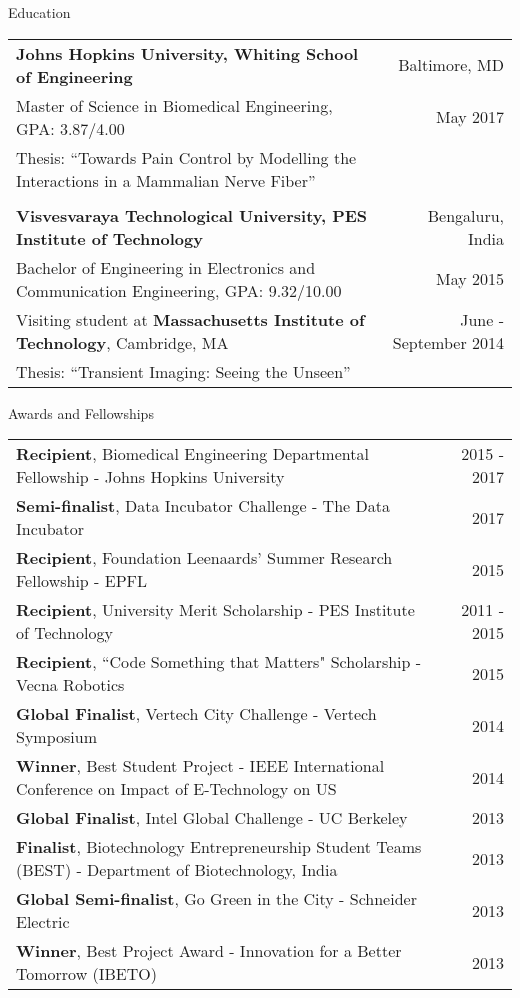 \documentclass{resume}
\begin{document}
\thispagestyle{empty}
  \begin{rSection}{Education}
\begin{tabular*}{\textwidth}{@{\extracolsep{\fill}}lr@{}}
\textbf{Johns Hopkins University, Whiting School of Engineering} & Baltimore, MD \\
{Master of Science in Biomedical Engineering}, GPA: 3.87/4.00 & May 2017 \\
Thesis: {``Towards Pain Control by Modelling the Interactions in a Mammalian Nerve Fiber''}\\ \\
\textbf{Visvesvaraya Technological University, PES Institute of Technology} & Bengaluru, India \\
{Bachelor of Engineering in Electronics and Communication Engineering}, GPA: 9.32/10.00 & May 2015 \\
Visiting student at \textbf{Massachusetts Institute of Technology}, Cambridge, MA & June - September 2014 \\
Thesis: {``Transient Imaging: Seeing the Unseen''}\\
\end{tabular*}
  \end{rSection}

\vspace{1em}

        \begin{rSection}{Awards and Fellowships}
\begin{tabular*}{\textwidth}{@{\extracolsep{\fill}}lr@{}}
\textbf{Recipient}, Biomedical Engineering Departmental Fellowship - Johns Hopkins University & 2015 - 2017\\ 
\textbf{Semi-finalist}, Data Incubator Challenge - The Data Incubator & 2017\\
\textbf{Recipient}, Foundation Leenaards' Summer Research Fellowship - EPFL &  2015\\
\textbf{Recipient}, University Merit Scholarship - PES Institute of Technology & 2011 - 2015 \\ 
\textbf{Recipient}, ``Code Something that Matters" Scholarship - Vecna Robotics & 2015\\
\textbf{Global Finalist}, Vertech City Challenge - Vertech Symposium  & 2014\\
\textbf{Winner}, Best Student Project - IEEE International Conference on Impact of E-Technology on US & 2014\\
\textbf{Global Finalist}, Intel Global Challenge -  UC Berkeley & 2013 \\
\textbf{Finalist}, Biotechnology Entrepreneurship Student Teams (BEST) - Department of Biotechnology, India & 2013\\
\textbf{Global Semi-finalist}, Go Green in the City - Schneider Electric & 2013 \\
\textbf{Winner}, Best Project Award - Innovation for a Better Tomorrow (IBETO)  & 2013\\
\end{tabular*}
    \end{rSection}
\end{document}
